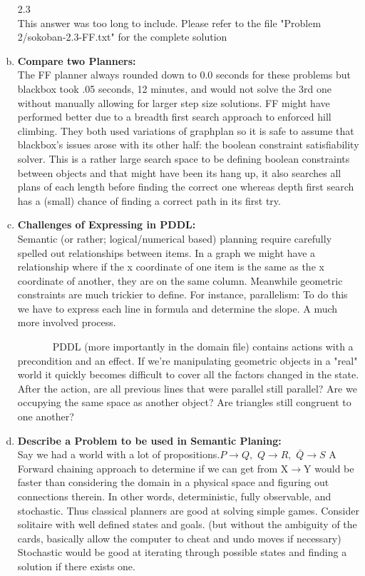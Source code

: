 \documentclass[]{article}
\begin{document}
\begin{enumerate}[(a)]
		   2.3\\   
		   This answer was too long to include. Please refer to the file "Problem 2/sokoban-2.3-FF.txt" for the complete solution\\
		   
		\item \textbf{Compare two Planners:}\\
		The FF planner always rounded down to 0.0 seconds for these problems but blackbox took .05 seconds, 12 minutes, and would not solve the 3rd one without manually allowing for larger step size solutions. FF might have performed better due to a breadth first search approach to enforced hill climbing. They both used variations of graphplan so it is safe to assume that blackbox's issues arose with its other half: the boolean constraint satisfiability solver. This is a rather large search space to be defining boolean constraints between objects and that might have been its hang up, it also searches all plans of each length before finding the correct one whereas depth first search has a (small) chance of finding a correct path in its first try. 
		\item \textbf{Challenges of Expressing in PDDL:}\\
		Semantic (or rather; logical/numerical based) planning require carefully spelled out relationships between items. In a graph we might have a relationship where if the x coordinate of one item is the same as the x coordinate of another, they are on the same column. Meanwhile geometric constraints are much trickier to define. For instance, parallelism: To do this we have to express each line in formula and determine the slope. A much more involved process. 
		
		~~~~~~~PDDL (more importantly in the domain file) contains actions with a precondition and an effect. If we're manipulating geometric objects in a "real" world it quickly becomes difficult to cover all the factors changed in the state. After the action, are all previous lines that were parallel still parallel? Are we occupying the same space as another object? Are triangles still congruent to one another?\\
		\item \textbf{Describe a Problem to be used in Semantic Planing:}\\
		Say we had a world with a lot of propositions.\( P\rightarrow Q,\) \(Q\rightarrow R,\) \(\bar{Q}\rightarrow S\) A Forward chaining approach to determine if we can get from X\(\rightarrow\)Y would be faster than considering the domain in a physical space and figuring out connections therein. In other words, deterministic, fully observable, and stochastic. Thus classical planners are good at solving simple games. Consider solitaire with well defined states and goals. (but without the ambiguity of the cards, basically allow the computer to cheat and undo moves if necessary) Stochastic would be good at iterating through possible states and finding a solution if there exists one.
	\end{enumerate}
\end{document}

